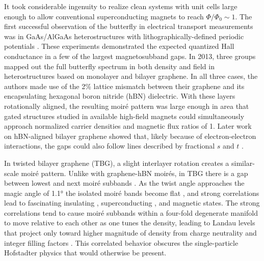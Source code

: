 \documentclass[12pt,twocolumn]{article}
\begin{document}
It took considerable ingenuity to realize clean systems with unit cells large enough to allow conventional superconducting magnets to reach $\Phi/\Phi_0\sim 1$. The first successful observation of the butterfly in electrical transport measurements was in GaAs/AlGaAs heterostructures with lithographically-defined periodic potentials \cite{albrechtEvidenceHofstadterFractal2001,geislerDetectionLandauBand2004,schlosserLandauSubbandsGenerated1996}. These experiments demonstrated the expected quantized Hall conductance in a few of the largest magnetosubband gaps. In 2013, three groups mapped out the full butterfly spectrum in both density and field in heterostructures based on monolayer \cite{huntMassiveDiracFermions2013,ponomarenkoCloningDiracFermions2013} and bilayer \cite{deanHofstadterButterflyFractal2013} graphene. In all three cases, the authors made use of the 2\% lattice mismatch between their graphene and its encapsulating hexagonal boron nitride (hBN) dielectric. With these layers rotationally aligned, the resulting moiré pattern was large enough in area that gated structures studied in available high-field magnets could simultaneously approach normalized carrier densities and magnetic flux ratios of 1. Later work on hBN-aligned bilayer graphene showed that, likely because of electron-electron interactions, the gaps could also follow lines described by fractional $s$ and $t$ \cite{spantonObservationFractionalChern2018}.

In twisted bilayer graphene (TBG), a slight interlayer rotation creates a similar-scale moiré pattern. Unlike with graphene-hBN moirés, in TBG there is a gap between lowest and next moiré subbands \cite{caoSuperlatticeInducedInsulatingStates2016}. As the twist angle approaches the magic angle of 1.1° the isolated moiré bands become flat \cite{bistritzerMoireBandsTwisted2011,liObservationVanHove2010}, and strong correlations lead to fascinating insulating \cite{caoCorrelatedInsulatorBehaviour2018,caoUnconventionalSuperconductivityMagicangle2018,polshynLargeLinearintemperatureResistivity2019,saitoIndependentSuperconductorsCorrelated2020,sharpeEmergentFerromagnetismThreequarters2019,stepanovCompetingZerofieldChern,yankowitzTuningSuperconductivityTwisted2019,zondinerCascadePhaseTransitions2020}, superconducting \cite{caoUnconventionalSuperconductivityMagicangle2018,polshynLargeLinearintemperatureResistivity2019,saitoIndependentSuperconductorsCorrelated2020,stepanovCompetingZerofieldChern,yankowitzTuningSuperconductivityTwisted2019,zondinerCascadePhaseTransitions2020}, and magnetic \cite{serlinIntrinsicQuantizedAnomalous2019,sharpeEmergentFerromagnetismThreequarters2019,stepanovCompetingZerofieldChern} states. The strong correlations tend to cause moiré subbands within a four-fold degenerate manifold to move relative to each other as one tunes the density, leading to Landau levels that project only toward higher magnitude of density from charge neutrality and integer filling factors \cite{wongCascadeElectronicTransitions2020,zondinerCascadePhaseTransitions2020}. This correlated behavior obscures the single-particle Hofstadter physics that would otherwise be present.
\end{document}
